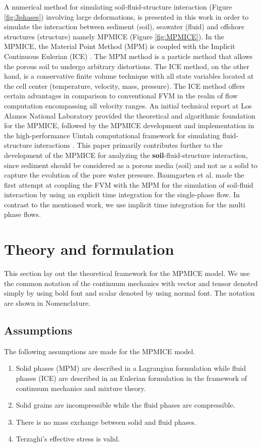 \documentclass[preprint,12pt]{elsarticle}
\begin{document}
A numerical method for simulating soil-fluid-structure interaction (Figure \ref{fig:3phases}) involving large deformations, is presented in this work in order to simulate the interaction between sediment (soil), seawater (fluid) and offshore structures (structure) namely MPMICE (Figure \ref{fig:MPMICE}). In the MPMICE, the Material Point Method (MPM) is coupled with the Implicit Continuous Eulerian (ICE) \cite{HARLOW196880}. The MPM method is a particle method that allows the porous soil to undergo arbitrary distortions. The ICE method, on the other hand, is a conservative finite volume technique with all state variables located at the cell center (temperature, velocity, mass, pressure). The ICE method offers certain advantages in comparison to conventional FVM in the realm of flow computation encompassing all velocity ranges. An initial technical report \cite{Kashiwa} at Los Alamos National Laboratory provided the theoretical and algorithmic foundation for the MPMICE, followed by the MPMICE development and implementation in the high-performance Uintah computational framework for simulating fluid-structure interactions \cite{MPMICE}. This paper primarily contributes further to the development of the MPMICE for analyzing the \textbf{soil}-fluid-structure interaction, since sediment should be considered as a porous media (soil) and not as a solid to capture the evolution of the pore water pressure. Baumgarten et al. \cite{Baumgarten2021} made the first attempt at coupling the FVM with the MPM for the simulation of soil-fluid interaction by using an explicit time integration for the single-phase flow. In contrast to the mentioned work, we use implicit time integration for the multi phase flows.
\section{\textsf{Theory and formulation}}
This section lay out the theoretical framework for the MPMICE model. We use the common notation of the continuum mechanics with vector and tensor denoted simply by using bold font and scalar denoted by using normal font. The notation are shown in Nomenclature.
\subsection{\textsf{Assumptions}}
The following assumptions are made for the MPMICE model.
\begin{enumerate}
\item Solid phases (MPM) are described in a Lagrangian formulation while fluid phases (ICE) are described in an Eulerian formulation in the framework of continuum mechanics and mixture theory.
\item Solid grains are incompressible while the fluid phases are compressible. 
\item There is no mass exchange between solid and fluid phases.
\item Terzaghi's effective stress is valid. 
\end {enumerate}
%
%
\end{document}
